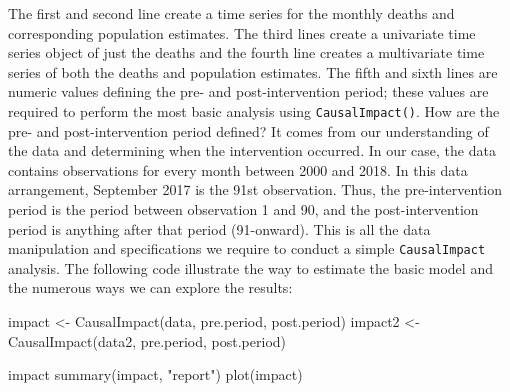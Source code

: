 \documentclass[12pt]{article}
\newenvironment{Shaded}{\begin{snugshade}}{\end{snugshade}}
\newcommand{\DecValTok}[1]{\textcolor[rgb]{0.00,0.00,0.81}{#1}}
\newcommand{\FunctionTok}[1]{\textcolor[rgb]{0.00,0.00,0.00}{#1}}
\newcommand{\NormalTok}[1]{#1}
\newcommand{\OtherTok}[1]{\textcolor[rgb]{0.56,0.35,0.01}{#1}}
\newcommand{\SpecialCharTok}[1]{\textcolor[rgb]{0.00,0.00,0.00}{#1}}
\newcommand{\StringTok}[1]{\textcolor[rgb]{0.31,0.60,0.02}{#1}}
\begin{document}
\begin{Shaded}
\end{Shaded}

The first and second line create a time series for the monthly deaths
and corresponding population estimates. The third lines create a
univariate time series object of just the deaths and the fourth line
creates a multivariate time series of both the deaths and population
estimates. The fifth and sixth lines are numeric values defining the
pre- and post-intervention period; these values are required to perform
the most basic analysis using \texttt{CausalImpact()}. How are the pre-
and post-intervention period defined? It comes from our understanding of
the data and determining when the intervention occurred. In our case,
the data contains observations for every month between 2000 and 2018. In
this data arrangement, September 2017 is the 91st observation. Thus, the
pre-intervention period is the period between observation 1 and 90, and
the post-intervention period is anything after that period (91-onward).
This is all the data manipulation and specifications we require to
conduct a simple \texttt{CausalImpact} analysis. The following code
illustrate the way to estimate the basic model and the numerous ways we
can explore the results:

\begin{Shaded}
\begin{Highlighting}[numbers=left,,]
\NormalTok{impact }\OtherTok{\textless{}{-}} \FunctionTok{CausalImpact}\NormalTok{(data, pre.period, post.period)}
\NormalTok{impact2 }\OtherTok{\textless{}{-}} \FunctionTok{CausalImpact}\NormalTok{(data2, pre.period, post.period)}

\NormalTok{impact}
\FunctionTok{summary}\NormalTok{(impact, }\StringTok{"report"}\NormalTok{)}
\FunctionTok{plot}\NormalTok{(impact)}
\end{Highlighting}
\end{Shaded}
\end{document}
